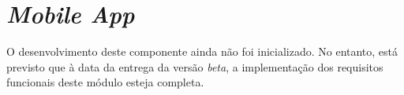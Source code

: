 \section{\textit{Mobile App}}
O desenvolvimento deste componente ainda não foi inicializado. No entanto, está previsto que à data da entrega da versão \textit{beta}, a implementação dos requisitos funcionais deste módulo esteja completa.